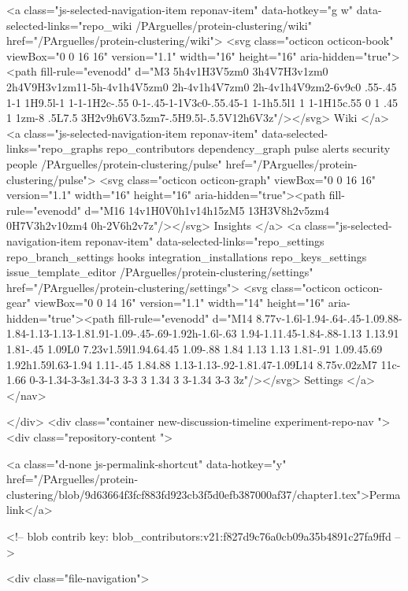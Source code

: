     <a class="js-selected-navigation-item reponav-item" data-hotkey="g w" data-selected-links="repo_wiki /PArguelles/protein-clustering/wiki" href="/PArguelles/protein-clustering/wiki">
      <svg class="octicon octicon-book" viewBox="0 0 16 16" version="1.1" width="16" height="16" aria-hidden="true"><path fill-rule="evenodd" d="M3 5h4v1H3V5zm0 3h4V7H3v1zm0 2h4V9H3v1zm11-5h-4v1h4V5zm0 2h-4v1h4V7zm0 2h-4v1h4V9zm2-6v9c0 .55-.45 1-1 1H9.5l-1 1-1-1H2c-.55 0-1-.45-1-1V3c0-.55.45-1 1-1h5.5l1 1 1-1H15c.55 0 1 .45 1 1zm-8 .5L7.5 3H2v9h6V3.5zm7-.5H9.5l-.5.5V12h6V3z"/></svg>
      Wiki
</a>
    <a class="js-selected-navigation-item reponav-item" data-selected-links="repo_graphs repo_contributors dependency_graph pulse alerts security people /PArguelles/protein-clustering/pulse" href="/PArguelles/protein-clustering/pulse">
      <svg class="octicon octicon-graph" viewBox="0 0 16 16" version="1.1" width="16" height="16" aria-hidden="true"><path fill-rule="evenodd" d="M16 14v1H0V0h1v14h15zM5 13H3V8h2v5zm4 0H7V3h2v10zm4 0h-2V6h2v7z"/></svg>
      Insights
</a>
    <a class="js-selected-navigation-item reponav-item" data-selected-links="repo_settings repo_branch_settings hooks integration_installations repo_keys_settings issue_template_editor /PArguelles/protein-clustering/settings" href="/PArguelles/protein-clustering/settings">
      <svg class="octicon octicon-gear" viewBox="0 0 14 16" version="1.1" width="14" height="16" aria-hidden="true"><path fill-rule="evenodd" d="M14 8.77v-1.6l-1.94-.64-.45-1.09.88-1.84-1.13-1.13-1.81.91-1.09-.45-.69-1.92h-1.6l-.63 1.94-1.11.45-1.84-.88-1.13 1.13.91 1.81-.45 1.09L0 7.23v1.59l1.94.64.45 1.09-.88 1.84 1.13 1.13 1.81-.91 1.09.45.69 1.92h1.59l.63-1.94 1.11-.45 1.84.88 1.13-1.13-.92-1.81.47-1.09L14 8.75v.02zM7 11c-1.66 0-3-1.34-3-3s1.34-3 3-3 3 1.34 3 3-1.34 3-3 3z"/></svg>
      Settings
</a>
</nav>


  </div>
<div class="container new-discussion-timeline experiment-repo-nav  ">
  <div class="repository-content ">

    
    



  
    <a class="d-none js-permalink-shortcut" data-hotkey="y" href="/PArguelles/protein-clustering/blob/9d63664f3fcf883fd923cb3f5d0efb387000af37/chapter1.tex">Permalink</a>

    <!-- blob contrib key: blob_contributors:v21:f827d9c76a0cb09a35b4891c27fa9ffd -->

    

    <div class="file-navigation">
      
